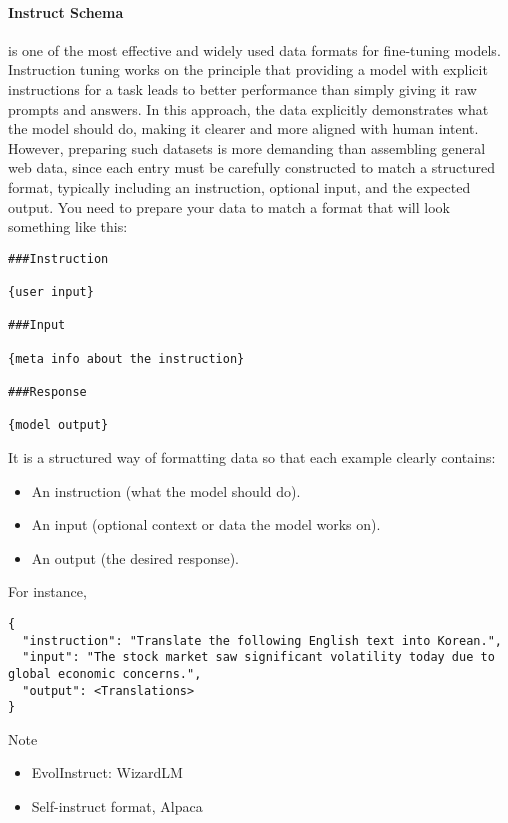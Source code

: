 \paragraph{Instruct Schema} is one of the most effective and widely used data formats for fine-tuning models. Instruction tuning works on the principle that providing a model with explicit instructions for a task leads to better performance than simply giving it raw prompts and answers. In this approach, the data explicitly demonstrates what the model should do, making it clearer and more aligned with human intent. However, preparing such datasets is more demanding than assembling general web data, since each entry must be carefully constructed to match a structured format, typically including an instruction, optional input, and the expected output. You need to prepare your data to match a format that will look something like this:
\begin{lstlisting}[]
###Instruction

{user input}

###Input

{meta info about the instruction}

###Response

{model output}
\end{lstlisting}
It is a structured way of formatting data so that each example clearly contains:
\begin{itemize}
	\item An instruction (what the model should do).
	\item An input (optional context or data the model works on).
	\item An output (the desired response).
\end{itemize}

For instance, 
\begin{lstlisting}
{
  "instruction": "Translate the following English text into Korean.",
  "input": "The stock market saw significant volatility today due to global economic concerns.",
  "output": <Translations>
}
\end{lstlisting}

\begin{commentbox}{Note}
	\begin{itemize}
		\item EvolInstruct: WizardLM
		\item Self-instruct format, Alpaca
	\end{itemize}
\end{commentbox}

